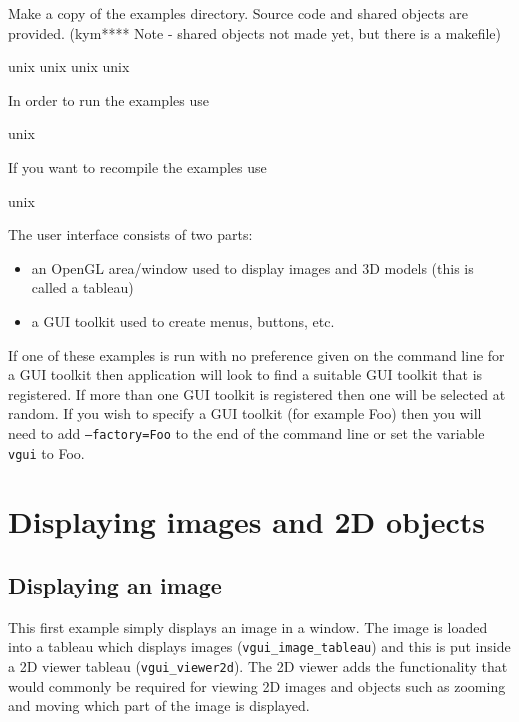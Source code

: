 \documentclass[12pt]{report}
\begin{document}
Make a copy of the examples directory.  Source code and shared objects are provided.
(kym**** Note - shared objects not made yet, but there is a makefile)
\scriptsize
\begin{verbawf}
  unix%
  unix%
  unix%
  unix%
\end{verbawf}
\normalsize

In order to run the examples use
\scriptsize
\begin{verbawf}
  unix%
\end{verbawf}
\normalsize

If you want to recompile the examples use
\scriptsize
\begin{verbawf}
  unix%
\end{verbawf}
\normalsize

The user interface consists of two parts: 
\begin{itemize}
\item an OpenGL area/window used to display images and 3D models 
(this is called a tableau) 
\item a GUI toolkit used to create menus, buttons, etc.   
\end{itemize}

If one of these examples is run with no preference given on the command line 
for a GUI toolkit then application will look to find a suitable GUI toolkit that is 
registered.  If more than one GUI toolkit is registered then one will be selected at 
random.  If you wish to specify a GUI toolkit (for example Foo) then you will need to add 
{\tt --factory=Foo} to the end of the command line or set the variable
{\tt vgui} to Foo.

\chapter{Displaying images and 2D objects}

\section{Displaying an image}
This first example simply displays an image in a window.
The image is loaded into a tableau which displays images ({\tt vgui\_image\_tableau}) 
and this is put inside a 2D viewer tableau ({\tt vgui\_viewer2d}).  The 2D viewer
adds the functionality that would commonly be required for viewing 2D images
and objects such as zooming and moving which part of the image is displayed.  
\end{document}

